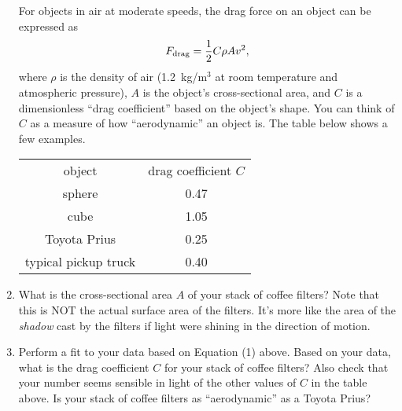 \begin{enumerate}[labparts]
For objects in air at moderate speeds, the drag force on an object can be expressed as
\begin{equation}
F_{\rm drag} = \frac{1}{2}C \rho A v^2,
\end{equation}
where $\rho$ is the density of air (1.2~kg/m$^3$ at room temperature and atmospheric pressure), 
$A$ is the object's cross-sectional area, and 
$C$ is a dimensionless ``drag coefficient'' based on the object's shape.  
You can think of $C$ as a measure of how ``aerodynamic'' an object is.  The table below shows a few examples.

\begin{center}
{\renewcommand{\arraystretch}{1.2}
\begin{tabular}{|c | c |}
\hline
object & drag coefficient $C$ \\ 
\hhline{|=|=|}
sphere & 0.47 \\ \hline
cube & 1.05 \\ \hline
Toyota Prius & 0.25 \\ \hline
typical pickup truck & 0.40 \\ \hline
\end{tabular}
}
\end{center}

\item What is the cross-sectional area $A$ of your stack of coffee filters?  Note that this is NOT the actual surface area of the filters.  It's more like the area of the \textit{shadow} cast by the filters if light were shining in the direction of motion.
\answerspace{0.8in}

\item Perform a fit to your data based on Equation (1) above.  Based on your data, what is the drag coefficient $C$ for your stack of coffee filters?  Also check that your number seems sensible in light of the other values of $C$ in the table above.  Is your stack of coffee filters as ``aerodynamic'' as a Toyota Prius?
\answerspace{0.8in}


\end{enumerate}

